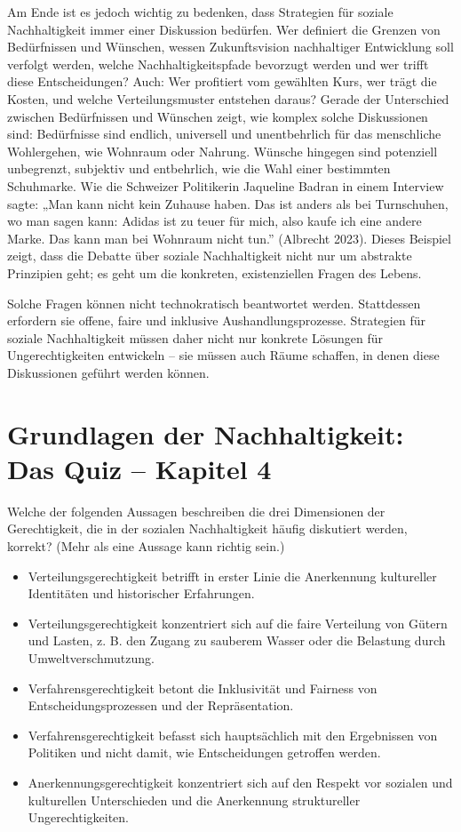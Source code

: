 \documentclass[
  nswissgerman,
  a4paper,
  DIV=11,
  numbers=noendperiod,
  oneside,
  openany]{scrreprt}
\providecommand{\tightlist}{%
  \setlength{\itemsep}{0pt}\setlength{\parskip}{0pt}}
\begin{document}
Am Ende ist es jedoch wichtig zu bedenken, dass Strategien für soziale
Nachhaltigkeit immer einer Diskussion bedürfen. Wer definiert die
Grenzen von Bedürfnissen und Wünschen, wessen Zukunftsvision
nachhaltiger Entwicklung soll verfolgt werden, welche
Nachhaltigkeitspfade bevorzugt werden und wer trifft diese
Entscheidungen? Auch: Wer profitiert vom gewählten Kurs, wer trägt die
Kosten, und welche Verteilungsmuster entstehen daraus? Gerade der
Unterschied zwischen Bedürfnissen und Wünschen zeigt, wie komplex solche
Diskussionen sind: Bedürfnisse sind endlich, universell und
unentbehrlich für das menschliche Wohlergehen, wie Wohnraum oder
Nahrung. Wünsche hingegen sind potenziell unbegrenzt, subjektiv und
entbehrlich, wie die Wahl einer bestimmten Schuhmarke. Wie die Schweizer
Politikerin Jaqueline Badran in einem Interview sagte: „Man kann nicht
kein Zuhause haben. Das ist anders als bei Turnschuhen, wo man sagen
kann: Adidas ist zu teuer für mich, also kaufe ich eine andere Marke.
Das kann man bei Wohnraum nicht tun.'' (Albrecht 2023). Dieses Beispiel
zeigt, dass die Debatte über soziale Nachhaltigkeit nicht nur um
abstrakte Prinzipien geht; es geht um die konkreten, existenziellen
Fragen des Lebens.

Solche Fragen können nicht technokratisch beantwortet werden.
Stattdessen erfordern sie offene, faire und inklusive
Aushandlungsprozesse. Strategien für soziale Nachhaltigkeit müssen daher
nicht nur konkrete Lösungen für Ungerechtigkeiten entwickeln -- sie
müssen auch Räume schaffen, in denen diese Diskussionen geführt werden
können.

\section{Grundlagen der Nachhaltigkeit: Das Quiz -- Kapitel
4}\label{grundlagen-der-nachhaltigkeit-das-quiz-kapitel-4}

Welche der folgenden Aussagen beschreiben die drei Dimensionen der
Gerechtigkeit, die in der sozialen Nachhaltigkeit häufig diskutiert
werden, korrekt? (Mehr als eine Aussage kann richtig sein.)

\begin{itemize}
\tightlist
\item[$\square$]
  Verteilungsgerechtigkeit betrifft in erster Linie die Anerkennung
  kultureller Identitäten und historischer Erfahrungen.
\item[$\square$]
  Verteilungsgerechtigkeit konzentriert sich auf die faire Verteilung
  von Gütern und Lasten, z. B. den Zugang zu sauberem Wasser oder die
  Belastung durch Umweltverschmutzung.
\item[$\square$]
  Verfahrensgerechtigkeit betont die Inklusivität und Fairness von
  Entscheidungsprozessen und der Repräsentation.
\item[$\square$]
  Verfahrensgerechtigkeit befasst sich hauptsächlich mit den Ergebnissen
  von Politiken und nicht damit, wie Entscheidungen getroffen werden.
\item[$\square$]
  Anerkennungsgerechtigkeit konzentriert sich auf den Respekt vor
  sozialen und kulturellen Unterschieden und die Anerkennung
  struktureller Ungerechtigkeiten.
\end{itemize}
\end{document}

